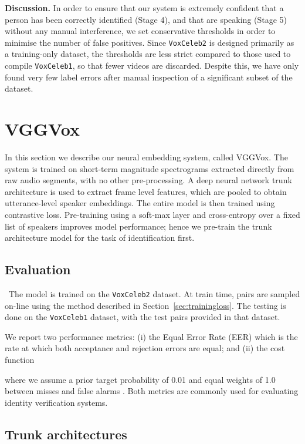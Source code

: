 \documentclass[a4paper]{article}
\def\newpara{\vspace{2pt}}
\def\subsec{\vspace{-5pt}}
\begin{document}
\newpara\noindent\textbf{Discussion. }  
In order to ensure that our system is extremely confident that a
person has been correctly
identified (Stage 4), and that are 
speaking 
 (Stage 5) without any manual interference, we set 
conservative thresholds in order to minimise the
number of false positives.  
Since \texttt{VoxCeleb2} is designed primarily as a training-only dataset,
the thresholds are less strict compared to those used to compile
\texttt{VoxCeleb1}, so that fewer videos are discarded.
Despite this, we have only found very few label errors after manual inspection
of a significant subset of the dataset.



\section{VGGVox}
\label{sec:vggvox}

In this section we describe our neural embedding system, called VGGVox.
  The system is trained on short-term magnitude spectrograms extracted directly from raw audio segments, with no other pre-processing. A deep
neural network trunk architecture is used to extract frame level
features, which are pooled to obtain utterance-level speaker
embeddings. The entire model is then trained using contrastive loss.
Pre-training using a soft-max layer and cross-entropy over a
fixed list of speakers improves model performance; hence we pre-train
the trunk architecture model for the task of identification first.

\subsection{Evaluation}
\subsec
\
The model is trained on the \texttt{VoxCeleb2} dataset.
At train time, pairs are sampled on-line using the method described in 
Section~\ref{sec:trainingloss}. The testing is done on the
\texttt{VoxCeleb1} dataset, with the test pairs provided
in that dataset.

We report two performance metrics:
(i) the Equal Error Rate (EER) which is the rate at 
which both acceptance and rejection errors are equal;
and
(ii) the cost function 

where we assume a prior target probability  of 0.01 and
equal weights of 1.0 between misses  and false alarms .
Both metrics are commonly used for evaluating  identity 
verification systems.

\subsection{Trunk architectures}
\subsec
\end{document}
